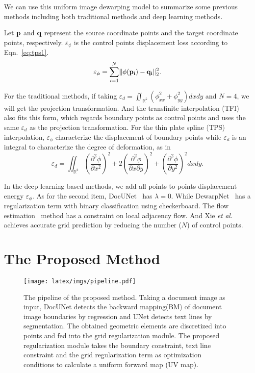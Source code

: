 \documentclass[10pt,twocolumn,letterpaper]{article}
\begin{document}
We can use this uniform image dewarping model to summarize some previous methods including both traditional methods and deep learning methods.

Let $\bf p$ and $\bf q$ represent the source coordinate points and the target coordinate points, respectively. $\varepsilon_{\phi}$ is the control points displacement loss according to Eqn.~\eqref{eq:tps1}.
\vspace{-0.5em}
\begin{equation}
  \varepsilon_{\phi}= \sum_{i=1}^{N} \lVert \phi({\bf p_{i}})- {\bf q_{i}}\rVert_{2}^{2}.
  \label{eq:tps1}
\end{equation}

For the traditional methods, if taking $\varepsilon_{d}= \iint_{\mathbb{R}^{2}}( \phi_{xx}^{2}+ \phi_{yy}^{2})dxdy$ and $N = 4$, we will get the projection transformation. And the transfinite interpolation (TFI) also fits this form, which regards boundary points as control points and uses the same $\varepsilon_{d}$ as the projection transformation. For the thin plate spline (TPS) interpolation, $\varepsilon_{\phi}$ characterize the displacement of boundary points while $\varepsilon_d$ is an integral to characterize the degree of deformation, as in
\begin{equation}
  \varepsilon_{d}= \iint_{\mathbb{R}^{2}}(\frac{\partial^{2} \phi }{\partial x^{2}})^{2}+2(\frac{\partial^{2} \phi }{\partial x\partial y})^{2}+(\frac{\partial^{2} \phi }{\partial y^{2}})^{2}dxdy.
  \label{eq:tps2}
\end{equation}


In the deep-learning based methods, we add all points to points displacement energy $\varepsilon_{	\phi}$. As for the second item, DocUNet~\cite{Ma_2018_CVPR} has $\lambda = 0$. While DewarpNet~\cite{Das_2019_ICCV} has a regularization term with binary classification using checkerboard. The flow estimation~\cite{xie2020dewarping} method has a constraint on local adjacency flow. And Xie {\em et al.}~\cite{xie2021document} achieves accurate grid prediction by reducing the number ($N$) of control points.

\section{The Proposed Method}
\begin{figure*}[!t]
  \centering
\texttt{[image: latex/imgs/pipeline.pdf]}
   \vspace{-2mm}
   \caption{The pipeline of the proposed method. Taking a document image as input, DocUNet detects the backward mapping(BM) of document image boundaries by regression and UNet detects text lines by segmentation. The obtained geometric elements are discretized into points and fed into the grid regularization module. The proposed regularization module takes the boundary constraint, text line constraint and the grid regularization term as optimization conditions to calculate a uniform forward map (UV map).}
  \label{fig:pipeline}
\end{figure*}
\end{document}
